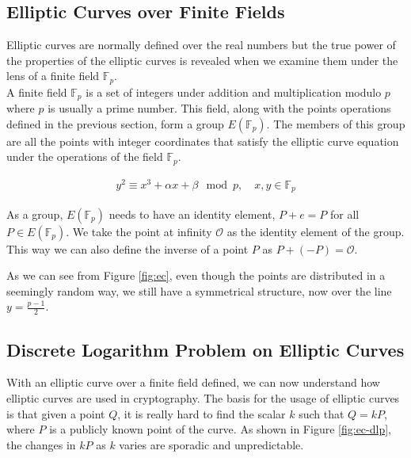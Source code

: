 \subsection{Elliptic Curves over Finite Fields}

Elliptic curves are normally defined over the real numbers but the true power of the properties of the elliptic curves is revealed when we examine them under the lens of a finite field $\mathbb{F}_p$.
\\

A finite field $\mathbb{F}_p$ is a set of integers under addition and multiplication modulo $p$ where $p$ is usually a prime number. This field, along with the points operations defined in the previous section, form a group $E(\mathbb{F}_p)$. The members of this group are all the points with integer coordinates that satisfy the elliptic curve equation under the operations of the field $\mathbb{F}_p$.

\begin{gather}
    y^2 \equiv x^3 + \alpha x + \beta \mod p, \quad x, y \in \mathbb{F}_p
\end{gather}

As a group, $E(\mathbb{F}_p)$ needs to have an identity element, $P + e = P$ for all $P \in E(\mathbb{F}_p)$. We take the point at infinity $\mathcal{O}$ as the identity element of the group. This way we can also define the inverse of a point $P$ as $P + (-P) = \mathcal{O}$.


As we can see from Figure \ref{fig:ec}, even though the points are distributed in a seemingly random way, we still have a symmetrical structure, now over the line $y = \frac{p - 1}{2}$.

\subsection{Discrete Logarithm Problem on Elliptic Curves}
With an elliptic curve over a finite field defined, we can now understand how elliptic curves are used in cryptography. The basis for the usage of elliptic curves is that given a point $Q$, it is really hard to find the scalar $k$ such that $Q = kP$, where $P$ is a publicly known point of the curve. As shown in Figure \ref{fig:ec-dlp}, the changes in $kP$ as $k$ varies are sporadic and unpredictable.


